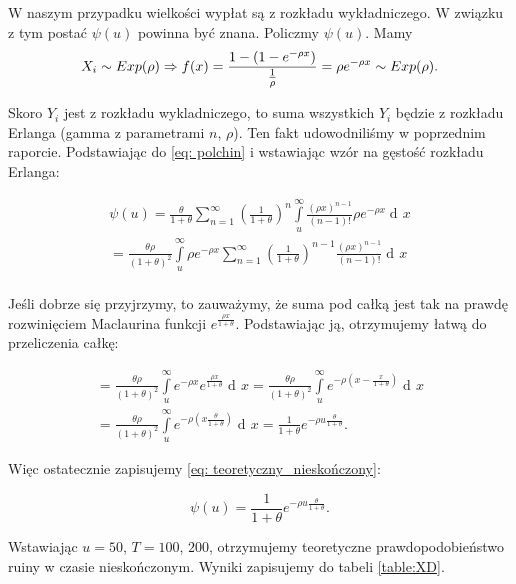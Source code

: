 \documentclass{article}
\theoremstyle{break}
\DeclareMathOperator{\diff}{d\!}
\numberwithin{equation}{subsection}
\numberwithin{figure}{section}
\begin{document}
W naszym przypadku wielkości wypłat są z rozkładu wykładniczego. W związku z tym postać $\psi(u)$ powinna być znana. Policzmy $\psi(u)$.
Mamy 
\begin{equation}
X_i\sim Exp(\rho) \Rightarrow f(x)=\frac{1-(1-e^{-\rho x})}{\frac{1}{\rho}}=\rho e^{-\rho x} \sim Exp(\rho).\\
\end{equation}

Skoro $Y_i$ jest z rozkładu wykladniczego, to suma wszystkich $Y_i$ będzie z rozkładu Erlanga (gamma z parametrami $n$, $\rho$). Ten fakt udowodniliśmy w poprzednim raporcie.
Podstawiając do \eqref{eq: polchin} i wstawiając wzór na gęstość rozkładu Erlanga:

\begin{gather}
	\psi(u)=\frac{\theta}{1+\theta}\sum_{n=1}^{\infty}\left(\frac{1}{1+\theta}\right)^n\int\limits_{u}^{\infty}\frac{(\rho x)^{n-1}}{(n-1)!} \rho e^{-\rho x}\diff{x} \\
	=\frac{\theta \rho}{(1+\theta)^2} \int\limits_{u}^{\infty}\rho e^{-\rho x}\sum_{n=1}^{\infty}\left(\frac{1}{1+\theta}\right)^{n-1}\frac{(\rho x)^{n-1}}{(n-1)!}\diff{x}\\
\end{gather}

Jeśli dobrze się przyjrzymy, to zauważymy, że suma pod całką jest tak na prawdę rozwinięciem Maclaurina funkcji $e^{\frac{\rho x}{1+\theta}}$. Podstawiając ją, otrzymujemy łatwą do przeliczenia całkę:

\begin{gather}
	=\frac{\theta\rho}{(1+\theta)^2}\int\limits_{u}^{\infty} e^{-\rho x} e^{\frac{\rho x}{1+\theta}}\diff{x}= \frac{\theta\rho}{(1+\theta)^2}\int\limits_{u}^{\infty} e^{-\rho (x-\frac{x}{1+\theta})}\diff{x}\\
	=\frac{\theta\rho}{(1+\theta)^2}\int\limits_{u}^{\infty} e^{-\rho (x\frac{\theta}{1+\theta})}\diff{x} = \frac{1}{1+\theta} e^{-\rho u \frac{\theta}{1+\theta}}.
\end{gather}

Więc ostatecznie zapisujemy \eqref{eq: teoretyczny_nieskończony}:

\begin{equation}
\psi(u) = \frac{1}{1+\theta} e^{-\rho u \frac{\theta}{1+\theta}}. \label{eq: teoretyczny_nieskończony}
\end{equation}

Wstawiając $u =50$, $T = 100$, $200$, otrzymujemy teoretyczne prawdopodobieństwo ruiny w czasie nieskończonym. Wyniki zapisujemy do tabeli \ref{table:XD}.
\end{document}
